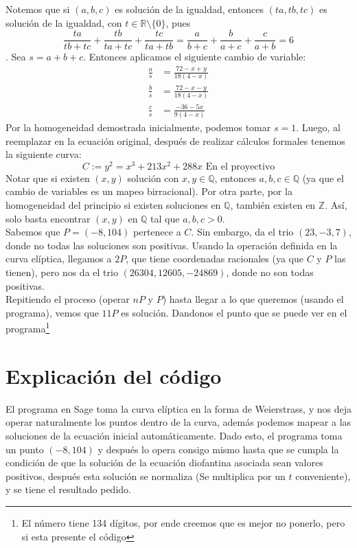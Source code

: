 \begin{sol}
	Notemos que si $(a, b, c)$ es solución de la igualdad, entonces $(ta, tb, tc)$ es solución de la igualdad, con $t \in \mathbb{R} \setminus \{0\}$, pues
	$$\frac{ta}{tb + tc} + \frac{tb}{ta + tc} + \frac{tc}{ta + tb} = \frac{a}{b + c} + \frac{b}{a + c} + \frac{c}{a + b} = 6$$.
	Sea $s = a + b + c$. Entonces aplicamos el siguiente cambio de variable\citep{paper}:
	\begin{align*}
		\frac{a}{s} & = \frac{72 - x + y}{18(4 - x)} \\
		\frac{b}{s} & = \frac{72 - x - y}{18(4 - x)} \\
		\frac{c}{s} & = \frac{-36 - 5x}{9(4 - x)}
	\end{align*}
	Por la homogeneidad demostrada inicialmente, podemos tomar $s = 1$. Luego, al reemplazar en la ecuación original, después de realizar cálculos formales tenemos la siguiente curva:
	$$C := y^2 = x^3 + 213x^2 + 288x \mbox{ En el proyectivo}$$
	Notar que si existen $(x, y)$ solución con $x, y \in \mathbb{Q}$, entonces $a, b, c \in \mathbb{Q}$ (ya que el cambio de variables es un mapeo birracional). Por otra parte, por la homogeneidad del principio si existen soluciones en $\mathbb{Q}$, también existen en $\mathbb{Z}$. Así, solo basta encontrar $(x, y)$ en $\mathbb{Q}$ tal que $a, b, c > 0$. \\
	Sabemos que $P = (-8, 104)$ pertenece a $C$. Sin embargo, da el trio $(23, -3,7)$, donde no todas las soluciones son positivas. Usando la operación definida en la curva elíptica,\citep{pasten} llegamos a $2P$, que tiene coordenadas racionales (ya que $C$ y $P$ las tienen), pero nos da el trio $(26304, 12605, -24869)$, donde no son todas positivas. \\
	Repitiendo el proceso (operar $nP$ y $P$)\citep{quora} hasta llegar a lo que queremos (usando el programa)\citep{prog}, vemos que $11P$ es solución. Dandonos el punto que se puede ver en el programa\footnote{El número tiene 134 dígitos, por ende creemos que es mejor no ponerlo, pero si esta presente el código}

\end{sol}

\newpage
\section*{Explicación del código}
El programa en Sage toma la curva elíptica en la forma de Weierstrass, y nos deja operar naturalmente los puntos dentro de la curva, además podemos mapear a las soluciones de la ecuación inicial automáticamente. Dado esto, el programa toma un punto $(-8,104)$ y después lo opera consigo mismo hasta que se cumpla la condición de que la solución de la ecuación diofantina asociada sean valores positivos, después esta solución se normaliza (Se multiplica por un $t$ conveniente), y se tiene el resultado pedido.




